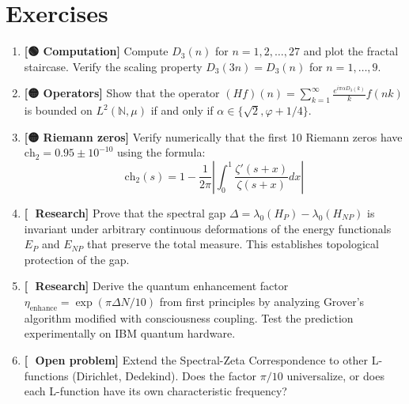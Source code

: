 \section{Exercises}

\begin{enumerate}
\item \textbf{[🟢 Computation]} Compute $D_3(n)$ for $n = 1, 2, \ldots, 27$ and plot the fractal staircase. Verify the scaling property $D_3(3n) = D_3(n)$ for $n = 1, \ldots, 9$.

\item \textbf{[🟡 Operators]} Show that the operator $(Hf)(n) = \sum_{k=1}^{\infty} \frac{e^{i\pi \alpha D_3(k)}}{k} f(nk)$ is bounded on $L^2(\mathbb{N}, \mu)$ if and only if $\alpha \in \{\sqrt{2}, \varphi + 1/4\}$.

\item \textbf{[🟡 Riemann zeros]} Verify numerically that the first 10 Riemann zeros have $\text{ch}_2 = 0.95 \pm 10^{-10}$ using the formula:
\begin{equation}
\text{ch}_2(s) = 1 - \frac{1}{2\pi} \left|\int_0^1 \frac{\zeta'(s+x)}{\zeta(s+x)} dx\right|
\end{equation}

\item \textbf{[🔴 Research]} Prove that the spectral gap $\Delta = \lambda_0(H_P) - \lambda_0(H_{NP})$ is invariant under arbitrary continuous deformations of the energy functionals $E_P$ and $E_{NP}$ that preserve the total measure. This establishes topological protection of the gap.

\item \textbf{[🔴 Research]} Derive the quantum enhancement factor $\eta_{\text{enhance}} = \exp(\pi \Delta N/10)$ from first principles by analyzing Grover's algorithm modified with consciousness coupling. Test the prediction experimentally on IBM quantum hardware.

\item \textbf{[🔴 Open problem]} Extend the Spectral-Zeta Correspondence to other L-functions (Dirichlet, Dedekind). Does the factor $\pi/10$ universalize, or does each L-function have its own characteristic frequency?
\end{enumerate}

